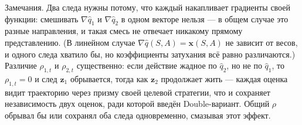 \begin{solution}
    Замечания. Два следа нужны потому, что каждый накапливает градиенты своей
    функции: смешивать $\nabla\hat q_1$ и $\nabla\hat q_2$ в одном векторе нельзя ---
    в общем случае это разные направления, и такая смесь не отвечает никакому
    прямому представлению. (В линейном случае $\nabla\hat q(S,A)=\mathbf x(S,A)$ не
    зависит от весов, и одного следа хватило бы, но коэффициенты затухания всё равно
    различаются.) Различие $\rho_{1,t}$ и $\rho_{2,t}$ существенно: если действие
    жадное по $\hat q_2$, но не по $\hat q_1$, то $\rho_{1,t}=0$ и след $\mathbf z_1$
    обрывается, тогда как $\mathbf z_2$ продолжает жить --- каждая оценка видит
    траекторию через призму своей целевой стратегии, что и сохраняет независимость
    двух оценок, ради которой введён Double-вариант. Общий $\rho$ обрывал бы или
    сохранял оба следа одновременно, смазывая этот эффект.
\end{solution}
